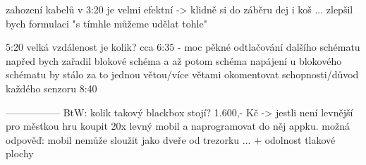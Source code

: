 zahození kabelů v 3:20 je velmi efektní -> klidně si do záběru dej i koš ... 
zlepšil bych formulaci "s tímhle můžeme udělat tohle" 

5:20 velká vzdálenost je kolik? 
cca 6:35 - moc pěkné odtlačování dalšího schématu 
napřed bych zařadil blokové schéma a až potom schéma napájení 
u blokového schématu by stálo za to jednou větou/více větami okomentovat schopnosti/důvod každého senzoru 
8:40  

-----------------
BtW: kolik takový blackbox stojí? 1.600,- Kč -> jestli není levnější 
pro městkou hru koupit 20x levný mobil a naprogramovat do něj appku.    
možná odpověď: mobil nemůže sloužit jako dveře od trezorku ...  + odolnost tlakové plochy 
